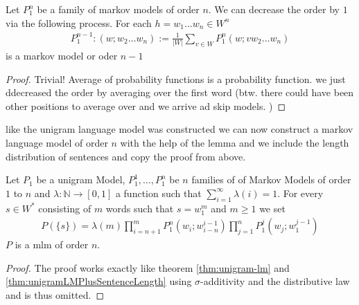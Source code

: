 \documentclass[•]{book}
\begin{document}
\begin{lemma}\label{lem:constructLowerOrderMarkovFamilies}
Let $P_1^n$ be a family of markov models  of order $n$. We can decrease the order by $1$ via the following process. 
For each $h=w_1\dots w_n\in W^n$ 
\begin{align}
P_1^{n-1}:(w;w_2\dots w_n):=\frac{1}{|W|}\sum_{v\in W}P_1^n(w;v w_2\dots w_n)
\end{align}
is a markov model or oder $n-1$ 
\begin{proof}
Trivial!  Average of probability functions is a probability function. we just ddecreased the order by averaging over the first word (btw. there could have been other positions to average over and we arrive ad skip models. )
\end{proof}
\end{lemma}

like the unigram language model was constructed we can now construct a markov language model of order $n$ with the help of the lemma and we include the length distribution of sentences and copy the proof from above. 
\begin{theorem}\label{thm:markovModelOrderN}
Let $P_1$ be a unigram Model, $P_1^1,\dots,P_1^n$ be $n$ families of of Markov Models of order $1$ to $n$ and $\lambda:\mathbb{N}\longrightarrow [0,1]$ a function such that $\sum_{i=1}^\infty\lambda(i) = 1$. For every $s\in W^{*}$ consisting of $m$ words such that $s=w_1^m$  and $m\geq 1$ we set
\begin{align}
P(\{s\})=\lambda(m)\prod_{i=n+1}^mP_1^n(w_i;w_{i-n}^{i-1})\prod_{j=1}^nP_1^{j}(w_j;w_1^{j-1})\label{formula:MarkovLMOrderN}
\end{align}
$P$ is a \gls{mlm} of order $n$.
\begin{proof}
The proof works exactly like theorem \ref{thm:unigram-lm} and \ref{thm:unigramLMPlusSentenceLength} using $\sigma$-additivity and the distributive law and is thus omitted. 
\end{proof}
\end{theorem}
\end{document}
